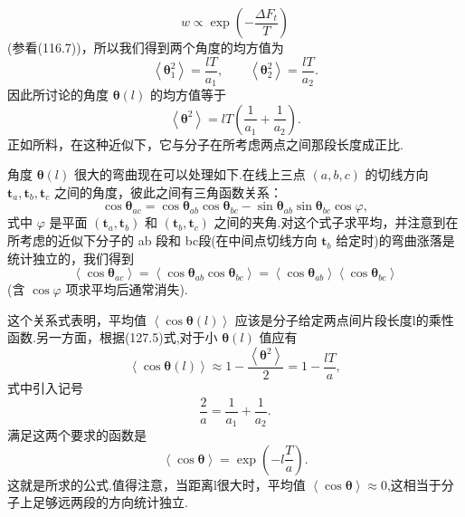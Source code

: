 \begin{equation*}
  w\propto\exp\left(-\frac{\Delta F_t}{T}\right)
\end{equation*}
(参看(116.7))，所以我们得到两个角度的均方值为
\begin{equation*}
  \left\langle\boldsymbol{\theta}_1^2\right\rangle=\frac{lT}{a_1},\qquad
  \left\langle\boldsymbol{\theta}_2^2\right\rangle=\frac{lT}{a_2}.
\end{equation*}
因此所讨论的角度 $\boldsymbol{\theta}(l)$ 的均方值等于
\begin{equation}
  \left\langle\boldsymbol{\theta}^2\right\rangle
  =lT\left(\frac{1}{a_1}+\frac{1}{a_2}\right).
\end{equation}
正如所料，在这种近似下，它与分子在所考虑两点之间那段长度成正比.

角度 $\boldsymbol{\theta}(l)$ 很大的弯曲现在可以处理如下.在线上三点 $(a,b,c)$ 的切线方向 $\boldsymbol{t}_a,\boldsymbol{t}_b,\boldsymbol{t}_c$ 之间的角度，彼此之间有三角函数关系：
\begin{equation*}
  \cos\boldsymbol{\theta}_{ac}
  =\cos\boldsymbol{\theta}_{ab}\cos\boldsymbol{\theta}_{bc}
  -\sin\boldsymbol{\theta}_{ab}\sin\boldsymbol{\theta}_{bc}\cos\varphi,
\end{equation*}
式中 $\varphi$ 是平面 $(\boldsymbol{t}_a,\boldsymbol{t}_b)$ 和 $(\boldsymbol{t}_b,\boldsymbol{t}_c)$ 之间的夹角.对这个式子求平均，并注意到在所考虑的近似下分子的 ab 段和 bc段(在中间点切线方向 $\boldsymbol{t}_b$ 给定时)的弯曲涨落是统计独立的，我们得到
\begin{equation*}
  \left\langle\cos\boldsymbol{\theta}_{ac}\right\rangle
  =\left\langle\cos\boldsymbol{\theta}_{ab}\cos\boldsymbol{\theta}_{bc}\right\rangle
  =\left\langle\cos\boldsymbol{\theta}_{ab}\right\rangle
  \left\langle\cos\boldsymbol{\theta}_{bc}\right\rangle
\end{equation*}
(含 $\cos\varphi$ 项求平均后通常消失).

这个关系式表明，平均值 $\left\langle\cos\boldsymbol{\theta}(l)\right\rangle$ 应该是分子给定两点间片段长度l的乘性函数.另一方面，根据(127.5)式,对于小 $\boldsymbol{\theta}(l)$ 值应有
\begin{equation*}
  \left\langle\cos\boldsymbol{\theta}(l)\right\rangle\approx
  1-\frac{\left\langle\boldsymbol{\theta}^2\right\rangle}{2}=1-\frac{lT}{a},
\end{equation*}
式中引入记号
\begin{equation*}
  \frac{2}{a}=\frac{1}{a_1}+\frac{1}{a_2}.
\end{equation*}
满足这两个要求的函数是
\begin{equation}
  \left\langle\cos\boldsymbol{\theta}\right\rangle
  =\exp\left(-l\frac{T}{a}\right).
\end{equation}
这就是所求的公式.值得注意，当距离l很大时，平均值 $\left\langle\cos\boldsymbol{\theta}\right\rangle\approx 0$,这相当于分子上足够远两段的方向统计独立.

